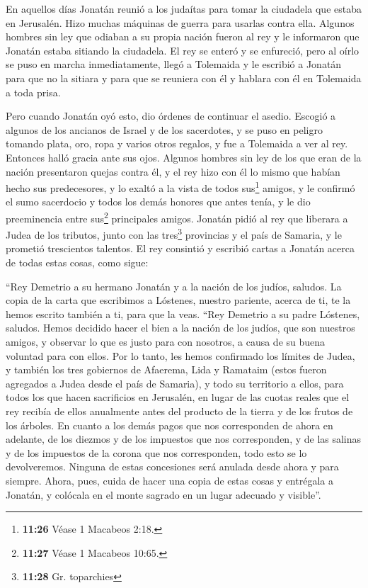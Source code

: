  En aquellos días Jonatán reunió a los judaítas para
tomar la ciudadela que estaba en Jerusalén. Hizo muchas máquinas de
guerra para usarlas contra ella.  Algunos hombres sin ley
que odiaban a su propia nación fueron al rey y le informaron que Jonatán
estaba sitiando la ciudadela.  El rey se enteró y se
enfureció, pero al oírlo se puso en marcha inmediatamente, llegó a
Tolemaida y le escribió a Jonatán para que no la sitiara y para que se
reuniera con él y hablara con él en Tolemaida a toda prisa.

 Pero cuando Jonatán oyó esto, dio órdenes de continuar
el asedio. Escogió a algunos de los ancianos de Israel y de los
sacerdotes, y se puso en peligro  tomando plata, oro,
ropa y varios otros regalos, y fue a Tolemaida a ver al rey. Entonces
halló gracia ante sus ojos.  Algunos hombres sin ley de
los que eran de la nación presentaron quejas contra él, 
y el rey hizo con él lo mismo que habían hecho sus predecesores, y lo
exaltó a la vista de todos sus\footnote{\textbf{11:26} Véase 1 Macabeos
  2:18.} amigos,  y le confirmó el sumo sacerdocio y
todos los demás honores que antes tenía, y le dio preeminencia entre
sus\footnote{\textbf{11:27} Véase 1 Macabeos 10:65.} principales amigos.
 Jonatán pidió al rey que liberara a Judea de los
tributos, junto con las tres\footnote{\textbf{11:28} Gr. toparchies}
provincias y el país de Samaria, y le prometió trescientos talentos.
 El rey consintió y escribió cartas a Jonatán acerca de
todas estas cosas, como sigue:

 ``Rey Demetrio a su hermano Jonatán y a la nación de los
judíos, saludos.  La copia de la carta que escribimos a
Lóstenes, nuestro pariente, acerca de ti, te la hemos escrito también a
ti, para que la veas.  ``Rey Demetrio a su padre
Lóstenes, saludos.  Hemos decidido hacer el bien a la
nación de los judíos, que son nuestros amigos, y observar lo que es
justo para con nosotros, a causa de su buena voluntad para con ellos.
 Por lo tanto, les hemos confirmado los límites de Judea,
y también los tres gobiernos de Afaerema, Lida y Ramataim (estos fueron
agregados a Judea desde el país de Samaria), y todo su territorio a
ellos, para todos los que hacen sacrificios en Jerusalén, en lugar de
las cuotas reales que el rey recibía de ellos anualmente antes del
producto de la tierra y de los frutos de los árboles.  En
cuanto a los demás pagos que nos corresponden de ahora en adelante, de
los diezmos y de los impuestos que nos corresponden, y de las salinas y
de los impuestos de la corona que nos corresponden, todo esto se lo
devolveremos.  Ninguna de estas concesiones será anulada
desde ahora y para siempre.  Ahora, pues, cuida de hacer
una copia de estas cosas y entrégala a Jonatán, y colócala en el monte
sagrado en un lugar adecuado y visible''.

